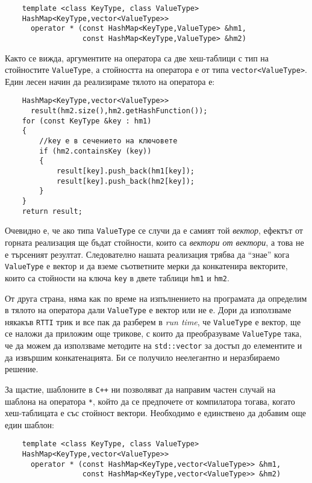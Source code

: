 \documentclass[12pt,a4paper]{article}
\begin{document}
\begin{enumerate}
\begin{mdframed}[hidealllines=true,backgroundcolor=gray!20]
	\begin{verbatim}
	template <class KeyType, class ValueType>
	HashMap<KeyType,vector<ValueType>>
	  operator * (const HashMap<KeyType,ValueType> &hm1,
	              const HashMap<KeyType,ValueType> &hm2)

	\end{verbatim}

		Както се вижда, аргументите на оператора са две хеш-таблици с тип на стойностите \texttt{ValueType}, а стойността на оператора е от типа \texttt{vector<ValueType>}. Един лесен начин да реализираме тялото на оператора е:
		\\


	\begin{verbatim}
	HashMap<KeyType,vector<ValueType>>
	  result(hm2.size(),hm2.getHashFunction());
	for (const KeyType &key : hm1)
	{
	    //key е в сечението на ключовете
	    if (hm2.containsKey (key))
	    {
	        result[key].push_back(hm1[key]);
	        result[key].push_back(hm2[key]);
	    }
	}
	return result;

	\end{verbatim}

		Очевидно е, че ако типа \texttt{ValueType} се случи да е самият той \emph{вектор}, ефектът от горната реализация ще бъдат стойности, които са \emph{вектори от вектори}, а това не е търсеният резултат. Следователно нашата реализация трябва да ``знае'' кога \texttt{ValueType} е вектор и да вземе съответните мерки да конкатенира векторите, които са стойности на ключа \texttt{key} в двете таблици \texttt{hm1} и \texttt{hm2}.

		От друга страна, няма как по време на изпълнението на програмата да определим в тялото на оператора дали \texttt{ValueType} е вектор или не е. Дори да използваме някакъв \texttt{RTTI} трик и все пак да разберем в \emph{run time}, че \texttt{ValueType} е вектор, ще се наложи да приложим още трикове, с които да преобразуваме \texttt{ValueType} така, че да можем да използваме методите на \texttt{std::vector} за достъп до елементите и да извършим конкатенацията. Би се получило неелегантно и неразбираемо решение.

		За щастие, шаблоните в \texttt{C++} ни позволяват да направим частен случай на шаблона на оператора \texttt{*}, който да се предпочете от компилатора тогава, когато хеш-таблицата е със стойност вектори. Необходимо е единствено да добавим още един шаблон:

	\begin{verbatim}
	template <class KeyType, class ValueType>
	HashMap<KeyType,vector<ValueType>>
	  operator * (const HashMap<KeyType,vector<ValueType>> &hm1,
	              const HashMap<KeyType,vector<ValueType>> &hm2)
	\end{verbatim}



\end{mdframed}
\end{enumerate}
\end{document}
